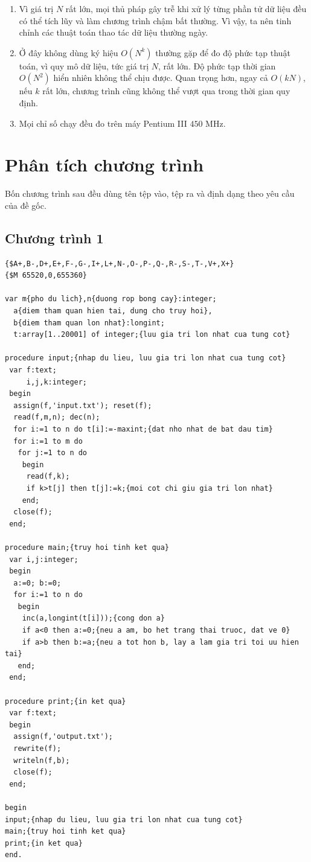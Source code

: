 \documentclass[11pt]{article}
\begin{document}
\begin{enumerate}
  \item \label{note:memory}Vì giá trị \(N\) rất lớn, mọi thủ pháp gây trễ khi
  xử lý từng phần tử dữ liệu đều có thể tích lũy và làm chương trình chậm bất
  thường. Vì vậy, ta nên tinh chỉnh các thuật toán thao tác dữ liệu thường
  ngày.
  \item \label{note:complexity}Ở đây không dùng ký hiệu \(O(N^k)\) thường
  gặp để đo độ phức tạp thuật toán, vì quy mô dữ liệu, tức giá trị \(N\), rất
  lớn. Độ phức tạp thời gian \(O(N^2)\) hiển nhiên không thể chịu được. Quan
  trọng hơn, ngay cả \(O(kN)\), nếu \(k\) rất lớn, chương trình cũng không thể
  vượt qua trong thời gian quy định.
  \item \label{note:timing}Mọi chỉ số chạy đều đo trên máy Pentium III
  \(450\) MHz.
\end{enumerate}

\section{Phân tích chương trình}

Bốn chương trình sau đều dùng tên tệp vào, tệp ra và định dạng theo yêu cầu
của đề gốc.

\subsection*{Chương trình 1}

\begin{verbatim}
{$A+,B-,D+,E+,F-,G-,I+,L+,N-,O-,P-,Q-,R-,S-,T-,V+,X+}
{$M 65520,0,655360}

var m{pho du lich},n{duong rop bong cay}:integer;
  a{diem tham quan hien tai, dung cho truy hoi},
  b{diem tham quan lon nhat}:longint;
  t:array[1..20001] of integer;{luu gia tri lon nhat cua tung cot}

procedure input;{nhap du lieu, luu gia tri lon nhat cua tung cot}
 var f:text;
     i,j,k:integer;
 begin
  assign(f,'input.txt'); reset(f);
  read(f,m,n); dec(n);
  for i:=1 to n do t[i]:=-maxint;{dat nho nhat de bat dau tim}
  for i:=1 to m do
   for j:=1 to n do
    begin
     read(f,k);
     if k>t[j] then t[j]:=k;{moi cot chi giu gia tri lon nhat}
    end;
  close(f);
 end;

procedure main;{truy hoi tinh ket qua}
 var i,j:integer;
 begin
  a:=0; b:=0;
  for i:=1 to n do
   begin
    inc(a,longint(t[i]));{cong don a}
    if a<0 then a:=0;{neu a am, bo het trang thai truoc, dat ve 0}
    if a>b then b:=a;{neu a tot hon b, lay a lam gia tri toi uu hien tai}
   end;
 end;

procedure print;{in ket qua}
 var f:text;
 begin
  assign(f,'output.txt');
  rewrite(f);
  writeln(f,b);
  close(f);
 end;

begin
input;{nhap du lieu, luu gia tri lon nhat cua tung cot}
main;{truy hoi tinh ket qua}
print;{in ket qua}
end.
\end{verbatim}
\end{document}
